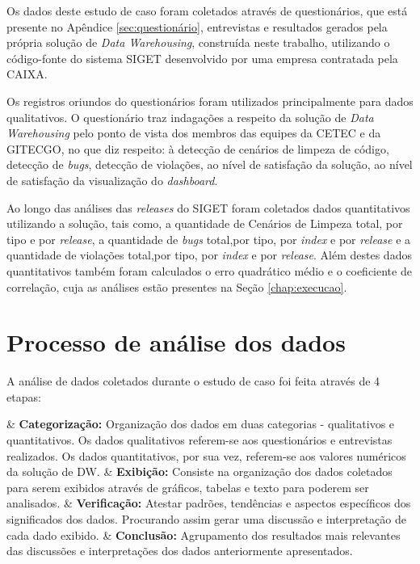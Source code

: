 Os dados deste estudo de caso foram coletados através de questionários, que está presente no Apêndice \ref{sec:questionário}, entrevistas e resultados gerados pela própria solução de \textit{Data Warehousing}, construída neste trabalho, utilizando o código-fonte do sistema SIGET desenvolvido por uma empresa contratada pela CAIXA.

Os registros oriundos do questionários foram utilizados principalmente para dados qualitativos. O questionário traz indagações a respeito da solução de \textit{Data Warehousing} pelo ponto de vista dos membros das equipes da CETEC e da GITECGO, no que diz respeito: à detecção de cenários de limpeza de código, detecção de \textit{bugs}, detecção de violações, ao nível de satisfação da solução, ao nível de satisfação da visualização do \textit{dashboard}.

Ao longo das análises das \textit{releases} do SIGET foram coletados dados quantitativos utilizando a solução, tais como, a quantidade de Cenários de Limpeza total, por tipo e por \textit{release}, a quantidade de \textit{bugs} total,por tipo, por \textit{index} e por \textit{release} e a quantidade de violações total,por tipo, por \textit{index} e por \textit{release}. Além destes dados quantitativos também foram calculados o erro quadrático médio e o coeficiente de correlação, cuja as análises estão presentes na Seção \ref{chap:execucao}.
 

\section{Processo de análise dos dados}
\label{sec:analise} 

A análise de dados coletados durante o estudo de caso foi feita através de 4 etapas:

\begin{easylist}[itemize]	
	
	& \textbf{Categorização: } Organização dos dados em duas categorias - qualitativos e quantitativos. Os dados qualitativos referem-se aos questionários e entrevistas realizados. Os dados quantitativos, por sua vez, referem-se aos valores numéricos da solução de DW. 
	& \textbf{Exibição: } Consiste na organização dos dados coletados para serem exibidos através de gráficos, tabelas e texto para poderem ser analisados. 
	& \textbf{Verificação: } Atestar padrões, tendências e aspectos específicos dos significados dos dados. Procurando assim gerar uma discussão e interpretação de cada dado exibido.
	& \textbf{Conclusão: } Agrupamento dos resultados mais relevantes das discussões e interpretações dos dados anteriormente apresentados.
	
	\end{easylist}	


